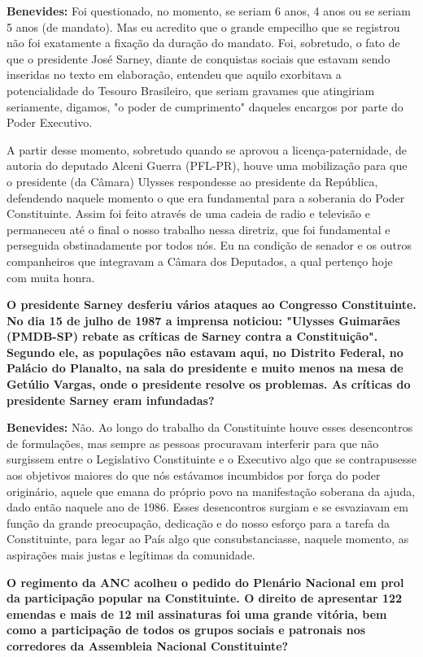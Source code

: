 \textbf{Benevides:} Foi questionado, no momento, se seriam 6 anos, 4
anos ou se seriam 5 anos (de mandato). Mas eu acredito que o grande
empecilho que se registrou não foi exatamente a fixação da duração do
mandato. Foi, sobretudo, o fato de que o presidente José Sarney, diante
de conquistas sociais que estavam sendo inseridas no texto em
elaboração, entendeu que aquilo exorbitava a potencialidade do Tesouro
Brasileiro, que seriam gravames que atingiriam seriamente, digamos, "o
poder de cumprimento" daqueles encargos por parte do Poder Executivo.

A partir desse momento, sobretudo quando se aprovou a
licença-paternidade, de autoria do deputado Alceni Guerra (PFL-PR),
houve uma mobilização para que o presidente (da Câmara) Ulysses
respondesse ao presidente da República, defendendo naquele momento o que
era fundamental para a soberania do Poder Constituinte. Assim foi feito
através de uma cadeia de radio e televisão e permaneceu até o final o
nosso trabalho nessa diretriz, que foi fundamental e perseguida
obstinadamente por todos nós. Eu na condição de senador e os outros
companheiros que integravam a Câmara dos Deputados, a qual pertenço hoje
com muita honra.

\textbf{O presidente Sarney desferiu vários ataques ao Congresso
Constituinte. No dia 15 de julho de 1987 a imprensa noticiou: "Ulysses
Guimarães (PMDB-SP) rebate as críticas de Sarney contra a Constituição".
Segundo ele, as populações não estavam aqui, no Distrito Federal, no
Palácio do Planalto, na sala do presidente e muito menos na mesa de
Getúlio Vargas, onde o presidente resolve os problemas. As críticas do
presidente Sarney eram infundadas?}

\textbf{Benevides:} Não. Ao longo do trabalho da Constituinte houve
esses desencontros de formulações, mas sempre as pessoas procuravam
interferir para que não surgissem entre o Legislativo Constituinte e o
Executivo algo que se contrapusesse aos objetivos maiores do que nós
estávamos incumbidos por força do poder originário, aquele que emana do
próprio povo na manifestação soberana da ajuda, dado então naquele ano
de 1986. Esses desencontros surgiam e se esvaziavam em função da grande
preocupação, dedicação e do nosso esforço para a tarefa da Constituinte,
para legar ao País algo que consubstanciasse, naquele momento, as
aspirações mais justas e legítimas da comunidade.

\textbf{O regimento da ANC acolheu o pedido do Plenário Nacional em prol
da participação popular na Constituinte. O direito de apresentar 122
emendas e mais de 12 mil assinaturas foi uma grande vitória, bem como a
participação de todos os grupos sociais e patronais nos corredores da
Assembleia Nacional Constituinte?}

